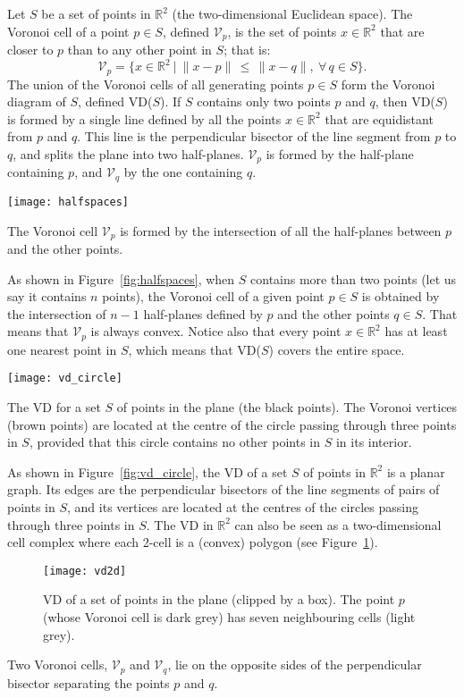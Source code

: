 Let $S$ be a set of points in $\mathbb{R}^2$ (the two-dimensional Euclidean space). 
The Voronoi cell of a point $p \in S$, defined $\mathcal{V}_{p}$, is the set of points $x \in \mathbb{R}^2$ that are closer to $p$ than to any other point in $S$; that is:
\begin{equation}
\mathcal{V}_p = \{x \in \mathbb{R}^{2} \ | \ \|x-p\| \, \leq \, \|x-q\|, \ \forall \, q \in S \}. 
\end{equation}
The union of the Voronoi cells of all generating points $p \in S$ form the Voronoi diagram of $S$, defined VD($S$). 
If $S$ contains only two points $p$ and $q$, then VD($S$) is formed by a single line defined by all the points $x \in \mathbb{R}^2$ that are equidistant from $p$ and $q$. 
This line is the perpendicular bisector of the line segment from $p$ to $q$, and splits the plane into two half-planes. 
$\mathcal{V}_p$ is formed by the half-plane containing $p$, and $\mathcal{V}_q$ by the one containing $q$. 
\begin{marginfigure}
  \centering
  \texttt{[image: halfspaces]}
  \caption{The Voronoi cell $\mathcal{V}_p$ is formed by the intersection of all the half-planes between $p$ and the other points. }%
\label{fig:halfspaces}
\end{marginfigure}
As shown in Figure~\ref{fig:halfspaces}, when $S$ contains more than two points (let us say it contains $n$ points), the Voronoi cell of a given point $p \in S$ is obtained by the intersection of $n-1$ half-planes defined by $p$ and the other points $q \in S$. 
That means that $\mathcal{V}_{p}$ is always convex. 
Notice also that every point $x \in \mathbb{R}^2$ has at least one nearest point in $S$, which means that VD($S$) covers the entire space.

%

\begin{marginfigure}
  \centering
  \texttt{[image: vd\_circle]}
  \caption{The VD for a set $S$ of points in the plane (the black points). The Voronoi vertices (brown points) are located at the centre of the circle passing through three points in $S$, provided that this circle contains no other points in $S$ in its interior.}%
\label{fig:vd_circle}
\end{marginfigure}
As shown in Figure~\ref{fig:vd_circle}, the VD of a set $S$ of points in $\mathbb{R}^2$ is a planar graph. 
Its edges are the perpendicular bisectors of the line segments of pairs of points in $S$, and its vertices are located at the centres of the circles passing through three points in $S$. 
The VD in $\mathbb{R}^2$ can also be seen as a two-dimensional cell complex where each 2-cell is a (convex) polygon (see Figure~\ref{fig:vd2d}). 
\begin{figure}
  \centering
  \texttt{[image: vd2d]}
  \caption{VD of a set of points in the plane (clipped by a box). The point $p$ (whose Voronoi cell is dark grey) has seven neighbouring cells (light grey).}%
\label{fig:vd2d}
\end{figure}
Two Voronoi cells, $\mathcal{V}_{p}$ and $\mathcal{V}_{q}$, lie on the opposite sides of the perpendicular bisector separating the points $p$ and $q$. 

